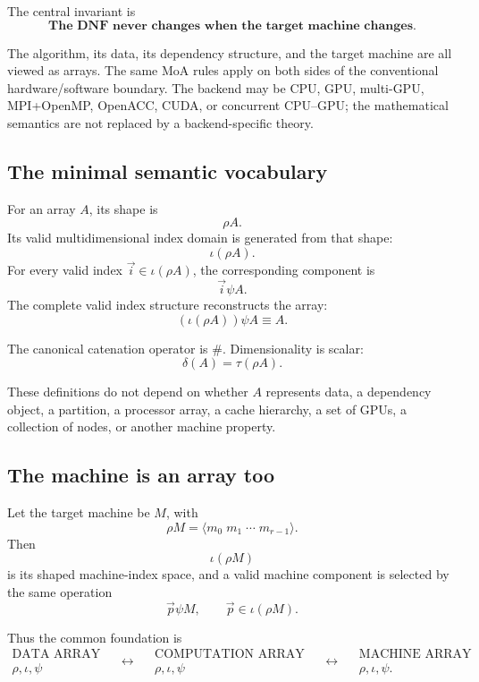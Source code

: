 \documentclass[11pt]{article}
\begin{document}
The central invariant is
\[
\boxed{\textbf{The DNF never changes when the target machine changes.}}
\]

The algorithm, its data, its dependency structure, and the target machine are all viewed as
arrays.  The same MoA rules apply on both sides of the conventional hardware/software boundary.
The backend may be CPU, GPU, multi-GPU, MPI+OpenMP, OpenACC, CUDA, or concurrent CPU--GPU;
the mathematical semantics are not replaced by a backend-specific theory.

\subsection{The minimal semantic vocabulary}

For an array \(A\), its shape is
\[
\boxed{\rho A.}
\]
Its valid multidimensional index domain is generated from that shape:
\[
\boxed{\iota(\rho A).}
\]
For every valid index \(\vec i\in\iota(\rho A)\), the corresponding component is
\[
\boxed{\vec i\psi A.}
\]
The complete valid index structure reconstructs the array:
\[
\boxed{(\iota(\rho A))\psi A\equiv A.}
\]

The canonical catenation operator is \(\#\).  Dimensionality is scalar:
\[
\boxed{\delta(A)=\tau(\rho A).}
\]

These definitions do not depend on whether \(A\) represents data, a dependency object, a
partition, a processor array, a cache hierarchy, a set of GPUs, a collection of nodes, or another
machine property.

\subsection{The machine is an array too}

Let the target machine be \(M\), with
\[
\boxed{
\rho M=\langle m_0\;m_1\;\cdots\;m_{r-1}\rangle .
}
\]
Then
\[
\iota(\rho M)
\]
is its shaped machine-index space, and a valid machine component is selected by the same
operation
\[
\vec p\psi M,\qquad \vec p\in\iota(\rho M).
\]

Thus the common foundation is
\[
\boxed{
\begin{array}{c}
\text{DATA ARRAY}\\
\rho,\iota,\psi
\end{array}
\quad\longleftrightarrow\quad
\begin{array}{c}
\text{COMPUTATION ARRAY}\\
\rho,\iota,\psi
\end{array}
\quad\longleftrightarrow\quad
\begin{array}{c}
\text{MACHINE ARRAY}\\
\rho,\iota,\psi .
\end{array}}
\]
\end{document}
